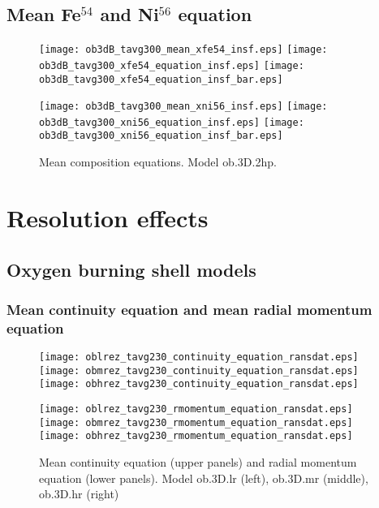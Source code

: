 \documentclass[10pt,paper=a4]{report}
\begin{document}
\newpage

\subsection{Mean Fe$^{54}$ and Ni$^{56}$ equation}

\begin{figure}[!h]
\centerline{
\texttt{[image: ob3dB\_tavg300\_mean\_xfe54\_insf.eps]}
\texttt{[image: ob3dB\_tavg300\_xfe54\_equation\_insf.eps]}
\texttt{[image: ob3dB\_tavg300\_xfe54\_equation\_insf\_bar.eps]}}

\centerline{
\texttt{[image: ob3dB\_tavg300\_mean\_xni56\_insf.eps]}
\texttt{[image: ob3dB\_tavg300\_xni56\_equation\_insf.eps]}
\texttt{[image: ob3dB\_tavg300\_xni56\_equation\_insf\_bar.eps]}}
\caption{Mean composition equations. Model {\sf ob.3D.2hp}. \label{fig:xfe52-xfe54-equations}}
\end{figure}

\newpage

\section{Resolution effects}

\subsection{Oxygen burning shell models}

\subsubsection{Mean continuity equation and mean radial momentum equation}

\begin{figure}[!h]
\centerline{
\texttt{[image: oblrez\_tavg230\_continuity\_equation\_ransdat.eps]}
\texttt{[image: obmrez\_tavg230\_continuity\_equation\_ransdat.eps]}
\texttt{[image: obhrez\_tavg230\_continuity\_equation\_ransdat.eps]}}

\centerline{
\texttt{[image: oblrez\_tavg230\_rmomentum\_equation\_ransdat.eps]}
\texttt{[image: obmrez\_tavg230\_rmomentum\_equation\_ransdat.eps]}
\texttt{[image: obhrez\_tavg230\_rmomentum\_equation\_ransdat.eps]}}
\caption{Mean continuity equation (upper panels) and radial momentum equation (lower panels). Model {\sf ob.3D.lr} (left), {\sf ob.3D.mr} (middle), {\sf ob.3D.hr} (right) \label{fig:ob-res-cont-rmomentum-equation}}
\end{figure}
\end{document}
